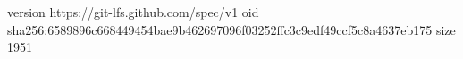 version https://git-lfs.github.com/spec/v1
oid sha256:6589896c668449454bae9b462697096f03252ffc3c9edf49ccf5c8a4637eb175
size 1951
